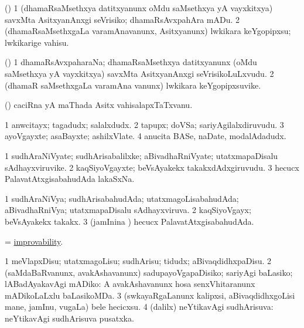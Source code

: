 \bentry
{}
\gl{\sakirx}
\bmng
(\birx) 
\bnum
\num{1} (dhamaRsaMsethxya datitxyanunx oMdu saMsethxya yA vayxkitxya) savxMta AsitxyanAnxgi seVrisiko; dhamaRsAvxpahAra mADu. 
\num{2} (dhamaRsaMsethxgaLa varamAnavanunx, Asitxyanunx) lwkikara keYgopipxsu; lwkikarige vahisu. 
\enum
\emng
\eentry

\bentry
{}
\gl{\nA}
\bmng
(\birx) 
\bnum
\num{1} dhamaRsAvxpaharaNa; dhamaRsaMsethxya datitxyanunx (oMdu saMsethxya yA vayxkitxya) savxMta AsitxyanAnxgi seVrisikoLuLxvudu. 
\num{2} (dhamaR saMsethxgaLa varamAna \mo vanunx) lwkikara keYgopipxsuvike. 
\enum
\emng
\eentry

\bentry
{}
\gl{\nA}
\bmng
(\birx) caciRna yA maThada Asitx vahisalapxTaTxvanu. 
\emng
\eentry

\bentry
{}
\gl{\nA}
\bmng
\bnum
\num{1} anwcitayx; tagadudx; salalxdudx. 
\num{2} tapupx; doVSa; sariyAgilalxdiruvudu. 
\num{3} ayoVgayxte; asaBayxte; ashilxVlate. 
\num{4} anucita BASe, naDate, modalAdadudx. 
\enum
\emng
\eentry

\bentry
{}
\gl{\nA}
\bmng
\bnum
\num{1} sudhAraNiVyate; sudhArisabalilxke; aBivadhaRniVyate; utatxmapaDisalu sAdhayxviruvike. 
\num{2} kaqSiyoVgayxte; beVsAyakekx takakxdAdxgiruvudu. 
\num{3} hecucx PalavatAtxgisabahudAda lakaSxNa. 
\enum
\emng
\eentry

\bentry
{}
\gl{\gu}
\bmng
\bnum
\num{1} sudhAraNiVya; sudhArisabahudAda; utatxmagoLisabahudAda; aBivadhaRniVya; utatxmapaDisalu sAdhayxviruva. 
\num{2} kaqSiyoVgayx; beVsAyakekx takakx. 
\num{3} (jamInina \vi) hecucx PalavatAtxgisabahudAda. 
\enum
\emng
\eentry

\bentry
{}
\gl{\nA}
\bmng
 = \hyperlink{improvability}{improvability}. 
\emng
\eentry

\bentry
{}
\gl{\sakirx}
\bmng
\bnum
\num{1} meVlapxDisu; utatxmagoLisu; sudhArisu; tidudx; aBivaqdidhxpaDisu. 
\num{2} (saMdaBaRvanunx, avakAshavanunx) sadupayoVgapaDisiko; sariyAgi baLasiko; lABadAyakavAgi mADiko:  A avakAshavanunx hosa senxVhitaranunx mADikoLaLxlu baLasikoMDa. 
\num{3} (swkayaRgaLanunx kalipxsi, aBivaqdidhxgoLisi mane, jamInu, \mo vugaLa) bele hecicxsu. 
\num{4} (\vakaq dalilx) neYtikavAgi sudhArisuva:  neYtikavAgi sudhArisuva pusatxka. 
\enum
\emng

